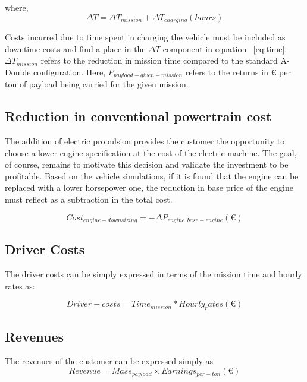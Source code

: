 \documentclass[ExampleMasters.tex]{subfiles}
\begin{document}
			where,
			\begin{equation}
				\Delta T = \Delta T_{mission}+\Delta T_{charging} (hours)
			\end{equation}

			Costs incurred due to time spent in charging the vehicle must be included as downtime costs and find a place in the $\Delta T$ component in equation ~\ref{eq:time}. $\Delta T_{mission}$ refers to the reduction in mission time compared to the standard A-Double configuration. Here, $P_{payload-given-mission}$ refers to the returns in \euro{} per ton of payload being carried for the given mission. 

		\subsection{Reduction in conventional powertrain cost}
			The addition of electric propulsion provides the customer the opportunity to choose a lower engine specification at the cost of the electric machine. The goal, of course, remains to motivate this decision and validate the investment to be profitable. Based on the vehicle simulations, if it is found that the engine can be replaced with a lower horsepower one, the reduction in base price of the engine must reflect as a subtraction in the total cost.

			\begin{equation}
				Cost_{engine-downsizing} = -\Delta P_{engine,base-engine} (\euro{})
			\end{equation}

		\subsection{Driver Costs}
			The driver costs can be simply expressed in terms of the mission time and hourly rates as:

			\begin{equation}
			Driver-costs = Time_{mission} * Hourly_rates (\euro{})
			\end{equation}

		\subsection{Revenues}
			The revenues of the customer can be expressed simply as
			\begin{equation}
			Revenue = Mass_{payload} \times Earnings_{per-ton} (\euro{})
			\end{equation}
\end{document}
